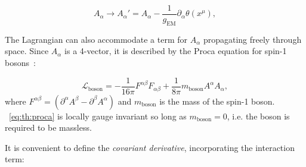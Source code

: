 \begin{equation}
\label{eq:th:photon_gauge}
A_{\alpha} \rightarrow  A_{\alpha}' =  A_{\alpha} - \frac{1}{g_{\textrm{EM}}} \partial_{\alpha} \theta(x^{\mu}),
\end{equation}


The Lagrangian can also accommodate a term for $A_{\alpha}$ propagating freely through space. Since $A_{\alpha}$ is a 4-vector, it is described by the Proca equation for spin-1 bosons~\cite{griffiths2008introduction}:

\begin{equation}
\label{eq:th:proca}
\mathcal{L}_{\textrm{boson}} = -\frac{1}{16\pi} F^{\alpha\beta}F_{\alpha\beta} + \frac{1}{8\pi} m_{\textrm{boson}} A^{\alpha} A_{\alpha},
\end{equation}
where $F^{\alpha \beta} =(\partial^{\alpha} A^{\beta} - \partial^{\beta} A^{\alpha})$ and $m_{\textrm{boson}}$ is the mass of the spin-1 boson. 
\Eq~\ref{eq:th:proca} is locally gauge invariant so long as $m_{\textrm{boson}}=0$, i.e. the boson is required to be massless.


It is convenient to define the \emph{covariant derivative}, incorporating the interaction term:

